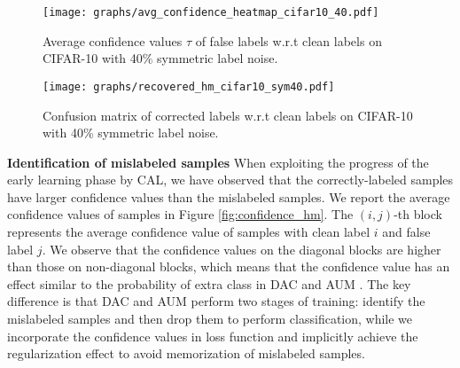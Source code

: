 \documentclass{article}
\begin{document}
\begin{figure}[t]
	\centering
	\begin{minipage}[t]{0.45\textwidth}
		\centering
		\texttt{[image: graphs/avg\_confidence\_heatmap\_cifar10\_40.pdf]}
		\caption{Average confidence values $\tau$ of false labels w.r.t clean labels on CIFAR-10 with 40\% symmetric label noise.}
		\label{fig:confidence_hm}
	\end{minipage}
	\hspace{0.5cm}
	\begin{minipage}[t]{0.45\textwidth}	
		\centering
		\texttt{[image: graphs/recovered\_hm\_cifar10\_sym40.pdf]}
		\caption{Confusion matrix of corrected labels w.r.t clean labels on CIFAR-10 with 40\% symmetric label noise.}
		\label{fig:label_recover}
	\end{minipage}
\vspace{-0.9em}
\end{figure}





\textbf{Identification of mislabeled samples} When exploiting the progress of the early learning phase by CAL, we have observed that the correctly-labeled samples have larger confidence values than the mislabeled samples. We report the average confidence values of samples in Figure \ref{fig:confidence_hm}. The $(i,j)$-th block represents the average confidence value of samples with clean label $i$ and false label $j$. We observe that the confidence values on the diagonal blocks are higher than those on non-diagonal blocks, which means that the confidence value has an effect similar to the probability of extra class in DAC \cite{thulasidasan2019combating} and AUM \cite{pleiss2020identifying}. The key difference is that DAC and AUM perform two stages of training: identify the mislabeled samples and then drop them to perform classification, while we incorporate the confidence values in loss function and implicitly achieve the regularization effect to avoid memorization of mislabeled samples. 












				
\end{document}
